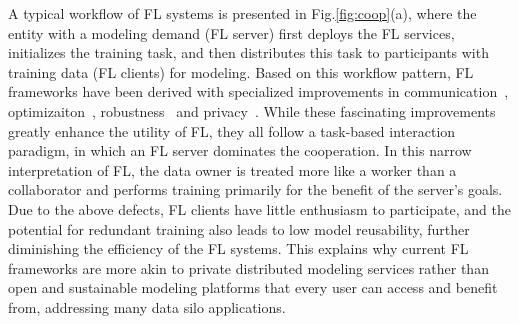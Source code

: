 A typical workflow of FL systems is presented in Fig.\ref{fig:coop}(a), where the entity with a modeling demand (FL server) first deploys the FL services, initializes the training task, and then distributes this task to participants with training data (FL clients) for modeling\cite{bonawitz2019towards}.
Based on this workflow pattern, FL frameworks have been derived with specialized improvements in communication~\cite{konevcny2016federated, mcmahan2017communication, xu2023asynchronous}, optimizaiton~\cite{li2018federated, karimireddy2020scaffold, li2021model}, robustness~\cite{duan2020self, sattler2019robust, li2022federated} and privacy~\cite{bonawitz2017practical, geyer2017differentially, cheng2021secureboost}.
While these fascinating improvements greatly enhance the utility of FL, they all follow a task-based interaction paradigm, in which an FL server dominates the cooperation.
In this narrow interpretation of FL, the data owner is treated more like a worker than a collaborator and performs training primarily for the benefit of the server's goals.
Due to the above defects, FL clients have little enthusiasm to participate, and the potential for redundant training also leads to low model reusability, further diminishing the efficiency of the FL systems.
This explains why current FL frameworks are more akin to private distributed modeling services rather than open and sustainable modeling platforms that every user can access and benefit from, addressing many data silo applications.

